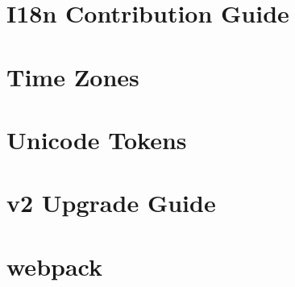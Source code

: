 \let\mypdfximage\pdfximage\def\pdfximage{\immediate\mypdfximage}\documentclass[twoside]{book}
\newcommand{\+}{\discretionary{\mbox{\scriptsize$\hookleftarrow$}}{}{}}
\begin{document}
\chapter{I18n Contribution Guide}
\label{md__c___users_zhart__one_drive__desktop_school_capstone_workspace_capstone_flight_risk_assesmentd10b3a1cc3653fd991341e93946c6347}

\chapter{Time Zones}
\label{md__c___users_zhart__one_drive__desktop_school_capstone_workspace_capstone_flight_risk_assesment1e1a444e94c598203a636ddeb2849e39}

\chapter{Unicode Tokens}
\label{md__c___users_zhart__one_drive__desktop_school_capstone_workspace_capstone_flight_risk_assesment19b0ab42925cb145c6ea5e6c58758e76}

\chapter{v2 Upgrade Guide}
\label{md__c___users_zhart__one_drive__desktop_school_capstone_workspace_capstone_flight_risk_assesment75f5d7da3a724153608cb7033416e623}

\chapter{webpack}
\label{md__c___users_zhart__one_drive__desktop_school_capstone_workspace_capstone_flight_risk_assesment1e979668f81b9c9a2206c8c1f0412d44}

\end{document}
